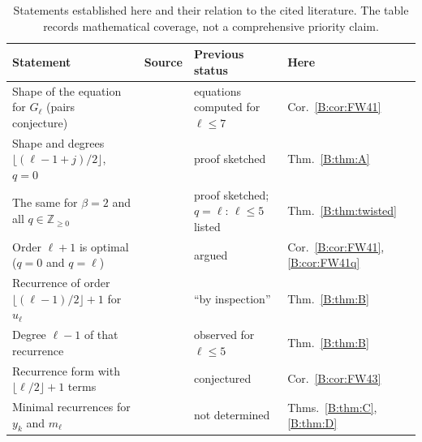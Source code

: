 \documentclass[11pt,a4paper]{article}
\theoremstyle{definition}
\theoremstyle{remark}
\newcommand{\Z}{\mathbb Z}
\newcommand{\fl}[1]{\lfloor #1\rfloor}
\numberwithin{equation}{section}
\begin{document}
\begin{table}[ht]
\centering
\small
\renewcommand{\arraystretch}{1.25}
\begin{tabular}{@{}>{\raggedright\arraybackslash}p{}>{\raggedright\arraybackslash}p{}>{\raggedright\arraybackslash}p{}>{\raggedright\arraybackslash}p{}@{}}
\toprule
Statement & Source & Previous status & Here\\
\midrule
Shape of the equation for $G_\ell$ (pairs conjecture) & \cite{BFK95,BG00} & equations computed for $\ell\le7$ & Cor.~\ref{B:cor:FW41}\\
Shape and degrees $\fl{(\ell-1+j)/2}$, $q=0$ & \cite[Prop.~4.1]{FW26} & proof sketched & Thm.~\ref{B:thm:A}\\
The same for $\beta=2$ and all $q\in\Z_{\ge0}$ & \cite[Prop.~4.1]{FW26} & proof sketched; $q=\ell$: $\ell\le5$ listed & Thm.~\ref{B:thm:twisted}\\
Order $\ell+1$ is optimal ($q=0$ and $q=\ell$) & \cite[App.~B]{FW26} & argued & Cor.~\ref{B:cor:FW41}, \ref{B:cor:FW41q}\\
Recurrence of order $\fl{(\ell-1)/2}+1$ for $u_\ell$ & \cite[Prop.~4.3]{FW26} & ``by inspection'' & Thm.~\ref{B:thm:B}\\
Degree $\ell-1$ of that recurrence & \cite{FW26} & observed for $\ell\le5$ & Thm.~\ref{B:thm:B}\\
Recurrence form with $\fl{\ell/2}+1$ terms & \cite{BFK95} & conjectured & Cor.~\ref{B:cor:FW43}\\
Minimal recurrences for $y_k$ and $m_\ell$ & & not determined & Thms.~\ref{B:thm:C}, \ref{B:thm:D}\\
\bottomrule
\end{tabular}
\medskip
\caption{Statements established here and their relation to the cited literature. The table records mathematical coverage, not a comprehensive priority claim.}\label{B:tab:closed}
\end{table}
\end{document}
